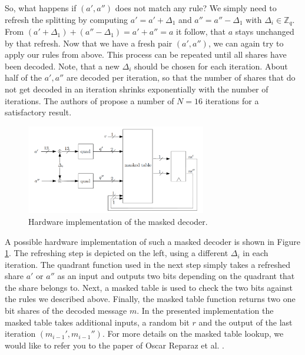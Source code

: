 So, what happens if \((a', a'')\) does not match any rule? We simply need to refresh the splitting by computing \(a' = a' + \Delta_1\) and \(a'' = a'' - \Delta_1\) with \(\Delta_i \in \mathbb{Z}_q\). From \((a' + \Delta_1) + (a'' - \Delta_1) = a' + a'' = a\) it follow, that \(a\) stays unchanged by that refresh. Now that we have a fresh pair \((a',a'')\), we can again try to apply our rules from above. This process can be repeated until all shares have been decoded. Note, that a new \(\Delta_i\) should be chosen for each iteration. About half of the \(a',a''\) are decoded per iteration, so that the number of shares that do not get decoded in an iteration shrinks exponentially with the number of iterations. The authors of \cite{maskedRing} propose a number of \(N = 16\) iterations for a satisfactory result.
\begin{figure}[H]
	\centering
	\includegraphics[width=0.7\textwidth]{maskedDecoder_2.png}
	\caption{Hardware implementation of the masked decoder. \cite{maskedRing}}
	\label{maskedDecoder_2}
\end{figure}
A possible hardware implementation of such a masked decoder is shown in Figure \ref{maskedDecoder_2}. The refreshing step is depicted on the left, using a different \(\Delta_i\) in each iteration. The quadrant function used in the next step simply takes a refreshed share \(a'\) or \(a''\) as an input and outputs two bits depending on the quadrant that the share belongs to. Next, a masked table is used to check the two bits against the rules we described above. Finally, the masked table function returns two one bit shares of the decoded message \(\textit{m}\). In the presented implementation the masked table takes additional inputs, a random bit \(r\) and the output of the last iteration \((m_{i-1}',m_{i-1}'')\). For more details on the masked table lookup, we would like to refer you to the paper of Oscar Reparaz et al. \cite{maskedRing}.


